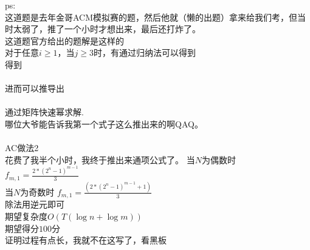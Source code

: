 \documentclass{article}
\begin{document}
ps:\\
这道题是去年金哥ACM模拟赛的题，然后他就（懒的出题）拿来给我们考，但当时太弱了，推了一个小时才想出来，最后还打炸了。\\
这道题官方给出的题解是这样的\\
对于任意$i\geq 1$，当$j\geq 3$时，有通过归纳法可以得到\\
得到\\
\\
进而可以推导出\\
\\
通过矩阵快速幂求解.\\
哪位大爷能告诉我第一个式子这么推出来的啊QAQ。\\
\\
AC做法2\\
花费了我半个小时，我终于推出来通项公式了。
当$N$为偶数时 \\
$f_{m,1}=\frac{2*(2^n-1)^{m-1}}{3}$\\
当$N$为奇数时
$f_{m,1}=\frac{(2*(2^n-1)^{m-1}+1)}{3}$\\
除法用逆元即可\\
期望复杂度$O(T(\log{n}+\log{m}))$\\
期望得分$100$分\\
证明过程有点长，我就不在这写了，看黑板\\
\newpage
\end{document}
